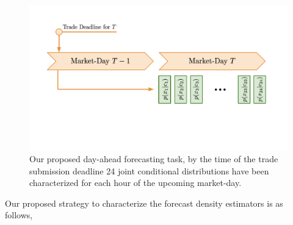 \begin{figure}[htbp]
    \caption[Illustration of the proposed forecasting methodology in relation to the day-ahead forecasting timeline]{
        Our proposed day-ahead forecasting task, by the time of the trade submission deadline 24 joint conditional
        distributions have been characterized for each hour of the upcoming market-day.
    }
    \begin{center}
        \setlength{\fboxsep}{0pt}%
        \setlength{\fboxrule}{1pt}%
            \includegraphics[width=120mm]{figs/da_fc_task.pdf}
    \end{center}
    \label{fig:da_fc_task}
\end{figure}

Our proposed strategy to characterize the forecast density estimators is as follows,

